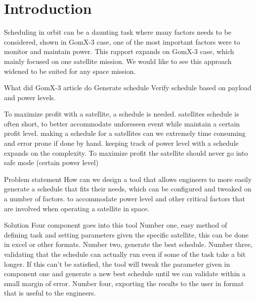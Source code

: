 \chapter{Introduction}\label{cha:intro}
Scheduling in orbit can be a daunting task where many factors needs to be considered, shown in GomX-3 case, one of the most important factors were to monitor and maintain power. This rapport expands on GomX-3 case, which mainly focused on one satellite mission. We would like to see this approach widened to be suited for any space mission.


What did GomX-3 article do
	Generate schedule
	Verify schedule based on payload and power levels.

To maximize profit with a satellite, a schedule is needed.
	satellites schedule is often short, to better accommodate unforeseen event while maintain a certain profit level.
	making a schedule for a satellites can we extremely time consuming and error prone if done by hand.
	keeping track of power level with a schedule expands on the complexity.
	To maximize profit the satellite should never go into safe mode (certain power level)
	
Problem statement
	How can we design a tool that allows engineers to more easily generate a schedule that fits their needs, which can be configured and tweaked on a number of factors. to accommodate power level and other critical factors that are involved when operating a satellite in space.
	
Solution
	Four component goes into this tool
	Number one, easy method of defining task and setting parameters given the specific satellite, this can be done in excel or other formats.
	Number two, generate the best schedule.
	Number three, validating that the schedule can actually run even if some of the task take a bit longer. If this can't be satisfied, the tool will tweak the parameter given in component one and generate a new best schedule until we can validate within a small margin of error.
	Number four, exporting the results to the user in format that is useful to the engineers.
